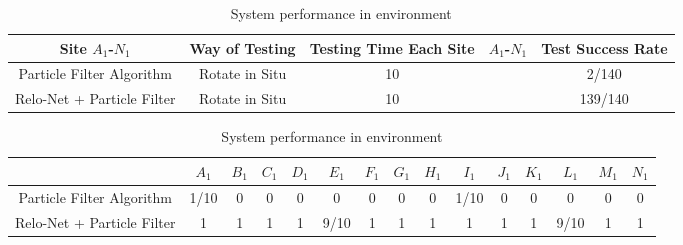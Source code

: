 \documentclass[journal]{IEEEtran}
\begin{document}
\begin{table}[]
	\centering
	\caption{ System performance in environment \uppercase\expandafter{}}
	\begin{tabular}{c|c|c|c|c}
		\hline
		Site $A_1$-$N_1$               & Way of Testing & Testing Time Each Site & $A_1$-$N_1$ & Test Success Rate \\ \hline
		Particle Filter Algorithm  & Rotate in Situ & 10                     &         &  2/140                \\ \hline
		Relo-Net + Particle Filter & Rotate in Situ & 10                     &         &  139/140           \\ \hline
	\end{tabular}
	\label{tablemap1} 

	\centering
	\begin{tabular}{c|c|c|c|c|c|c|c|c|c|c|c|c|c|c} 
		\hline
		& $A_1$  & $B_1$ & $C_1$ & $D_1$ &$ E_1 $ & $F_1$ & $G_1$ & $H_1$ &$ I_1$  & $J_1$ & $K_1$ & $L_1$  & $M_1$ & $N_1$ \\ \hline
		Particle Filter Algorithm  & 1/10 & 0   & 0   & 0   & 0    & 0   & 0   & 0   & 1/10 & 0   & 0   & 0    & 0   & 0   \\ \hline
		Relo-Net + Particle Filter & 1    & 1   & 1   & 1   & 9/10 & 1   & 1   & 1   & 1    & 1   & 1   & 9/10 & 1   & 1   \\ \hline
	\end{tabular}
\end{table}
\end{document}
